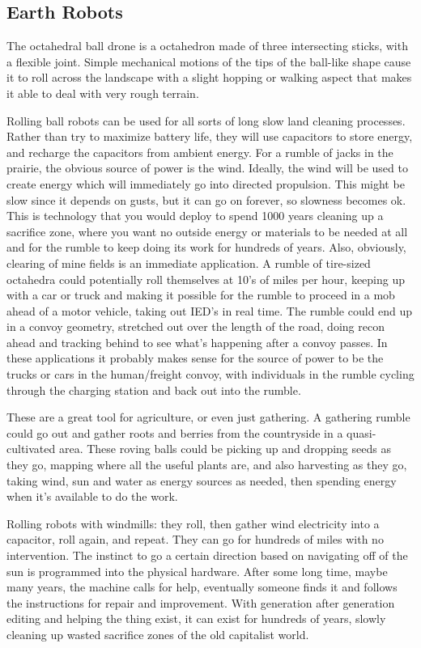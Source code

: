 \subsection{Earth Robots}\label{earth-robots}

The octahedral ball drone is a octahedron made of three intersecting
sticks, with a flexible joint. Simple mechanical motions of the tips of
the ball-like shape cause it to roll across the landscape with a slight
hopping or walking aspect that makes it able to deal with very rough
terrain.

Rolling ball robots can be used for all sorts of long slow land cleaning
processes. Rather than try to maximize battery life, they will use
capacitors to store energy, and recharge the capacitors from ambient
energy. For a rumble of jacks in the prairie, the obvious source of
power is the wind. Ideally, the wind will be used to create energy which
will immediately go into directed propulsion. This might be slow since
it depends on gusts, but it can go on forever, so slowness becomes ok.
This is technology that you would deploy to spend 1000 years cleaning up
a sacrifice zone, where you want no outside energy or materials to be
needed at all and for the rumble to keep doing its work for hundreds of
years. Also, obviously, clearing of mine fields is an immediate
application. A rumble of tire-sized octahedra could potentially roll
themselves at 10's of miles per hour, keeping up with a car or truck and
making it possible for the rumble to proceed in a mob ahead of a motor
vehicle, taking out IED's in real time. The rumble could end up in a
convoy geometry, stretched out over the length of the road, doing recon
ahead and tracking behind to see what's happening after a convoy passes.
In these applications it probably makes sense for the source of power to
be the trucks or cars in the human/freight convoy, with individuals in
the rumble cycling through the charging station and back out into the
rumble.

These are a great tool for agriculture, or even just gathering. A
gathering rumble could go out and gather roots and berries from the
countryside in a quasi-cultivated area. These roving balls could be
picking up and dropping seeds as they go, mapping where all the useful
plants are, and also harvesting as they go, taking wind, sun and water
as energy sources as needed, then spending energy when it's available to
do the work.

Rolling robots with windmills: they roll, then gather wind electricity
into a capacitor, roll again, and repeat. They can go for hundreds of
miles with no intervention. The instinct to go a certain direction based
on navigating off of the sun is programmed into the physical hardware.
After some long time, maybe many years, the machine calls for help,
eventually someone finds it and follows the instructions for repair and
improvement. With generation after generation editing and helping the
thing exist, it can exist for hundreds of years, slowly cleaning up
wasted sacrifice zones of the old capitalist world.

